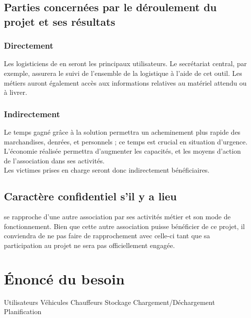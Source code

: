 \subsection{Parties concernées par le déroulement du projet et ses résultats}

\subsubsection{Directement}
Les logisticiens de \mo en seront les principaux utilisateurs. Le secrétariat central, par exemple, assurera le suivi de l'ensemble de la logistique à l'aide de cet outil.
Les métiers auront également accès aux informations relatives au matériel attendu ou à livrer.

\subsubsection{Indirectement}
Le temps gagné grâce à la solution permettra un acheminement plus rapide des marchandises, denrées, et personnels ; ce temps est crucial en situation d'urgence. L'économie réalisée permettra d'augmenter les capacités, et les moyens d'action de l'association dans ses activités.
\\
Les victimes prises en charge seront donc indirectement bénéficiaires.


\subsection{Caractère confidentiel s'il y a lieu}
\mo se rapproche d'une autre association par ses activités métier et son mode de fonctionnement. Bien que cette autre association puisse bénéficier de ce projet, il conviendra de ne pas faire de rapprochement avec celle-ci tant que sa participation au projet ne sera pas officiellement engagée.


\section{Énoncé du besoin}

Utilisateurs
Véhicules
Chauffeurs
Stockage
Chargement/Déchargement
Planification


